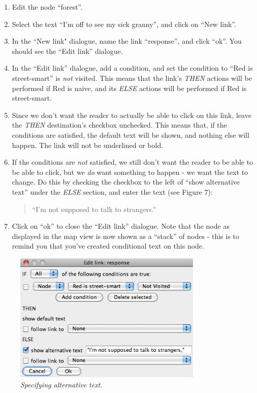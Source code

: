 \documentclass{article}
\begin{document}
\begin{enumerate}
  \item Edit the node ``forest''.
  \item Select the text ``I'm off to see my sick granny'', and click on
  ``New link''.
  \item In the ``New link" dialogue, name the link ``response'', and click
  ``ok''. You should see the ``Edit link'' dialogue.
  \item In the ``Edit link'' dialogue, add a condition, and set the condition
  to ``Red is street-smart'' is \textit{not} visited. This means that the
  link's \textit{THEN} actions will be performed if Red is naive, and its
  \textit{ELSE} actions will be performed if Red is street-smart.
  \item Since we don't want the reader to actually be able to click on this
  link, leave the \textit{THEN} destination's checkbox unchecked. This means
  that, if the conditions are satisfied, the default text will be shown, and
  nothing else will happen. The link will not be underlined or bold.
  \item If the conditions are \textit{not} satisfied, we still don't want the
  reader to be able to be able to click, but we \textit{do} want something to
  happen - we want the text to change. Do this by checking the checkbox to the
  left of ``show alternative text'' under the \textit{ELSE} section, and enter
  the text (see Figure 7):
  \begin{quotation}
  ``I'm not supposed to talk to strangers.''
  \end{quotation}
  \item Click on ``ok'' to close the ``Edit link'' dialogue. Note that the node
  as displayed in the map view is now shown as a ``stack'' of nodes - this is
  to remind you that you've created conditional text on this node.
\end{enumerate}

\begin{figure}[h]
  \centering
  \includegraphics[width=9cm]{images/hypedyn-tutorial-2-figure-7}
  \caption{\textit{Specifying alternative text.}}
\end{figure} 
\end{document}
